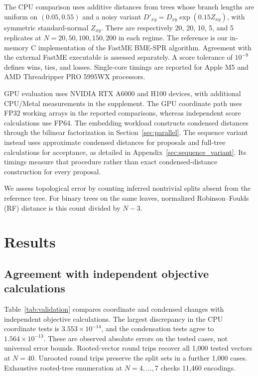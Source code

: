 \documentclass[11pt,a4paper]{article}
\makeatletter
\DeclareRobustCommand{\_}{\ifmmode\nfss@text{\textunderscore}\else\textunderscore\allowbreak\fi}
\theoremstyle{definition}
\makeatother
\begin{document}
The CPU comparison uses additive distances from trees whose branch lengths are uniform on $(0.05,0.55)$ and a noisy variant
$D'_{xy}=D_{xy}\exp(0.15Z_{xy})$, with symmetric standard-normal $Z_{xy}$.
There are respectively 20, 20, 10, 5, and 5 replicates at
$N=20,50,100,150,200$ in each regime.
The reference is our in-memory C implementation of the FastME BME-SPR algorithm.
Agreement with the external FastME executable is assessed separately.
A score tolerance of $10^{-9}$ defines wins, ties, and losses.
Single-core timings are reported for Apple M5 and AMD Threadripper PRO 5995WX processors.

GPU evaluation uses NVIDIA RTX A6000 and H100 devices, with additional CPU/Metal measurements in the supplement.
The GPU coordinate path uses FP32 working arrays in the reported comparisons, whereas independent score calculations use FP64.
The embedding workload constructs condensed distances through the bilinear factorization in Section~\ref{sec:parallel}.
The sequence variant instead uses approximate condensed distances for proposals and full-tree calculations for acceptance, as detailed in Appendix~\ref{sec:sequence_variant}.
Its timings measure that procedure rather than exact condensed-distance construction for every proposal.

We assess topological error by counting inferred nontrivial splits absent from the reference tree.
For binary trees on the same leaves, normalized Robinson--Foulds (RF) distance is this count divided by $N-3$.

\section{Results}
\label{sec:results}

\subsection{Agreement with independent objective calculations}
\label{sec:validation_results}

Table~\ref{tab:validation} compares coordinate and condensed changes with independent objective calculations.
The largest discrepancy in the CPU coordinate tests is $3.553\times10^{-14}$, and the condensation tests agree to $1.564\times10^{-13}$.
These are observed absolute errors on the tested cases, not universal error bounds.
Rooted-vector round trips recover all 1,000 tested vectors at $N=40$.
Unrooted round trips preserve the split sets in a further 1,000 cases.
Exhaustive rooted-tree enumeration at $N=4,\ldots,7$ checks 11,460 encodings.
\end{document}
